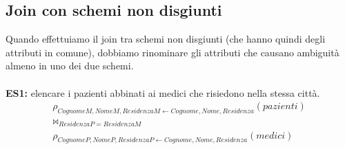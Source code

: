 \subsection{Join con schemi non disgiunti}
Quando effettuiamo il join tra schemi non disgiunti (che hanno quindi degli attributi in comune), dobbiamo rinominare gli attributi che causano ambiguità almeno in uno dei due schemi.\\\\
\textbf{ES1:} elencare i pazienti abbinati ai medici che risiedono nella stessa città.
    \begin{equation}\begin{aligned}
        \rho_{CognomeM, NomeM, ResidenzaM \leftarrow Cognome, Nome, Residenza}(pazienti)\\ 
        \bowtie_{ResidenzaP = ResidenzaM}\\
        \rho_{CognomeP, NomeP, ResidenzaP \leftarrow Cognome, Nome, Residenza}(medici)
    \end{aligned}\end{equation}

